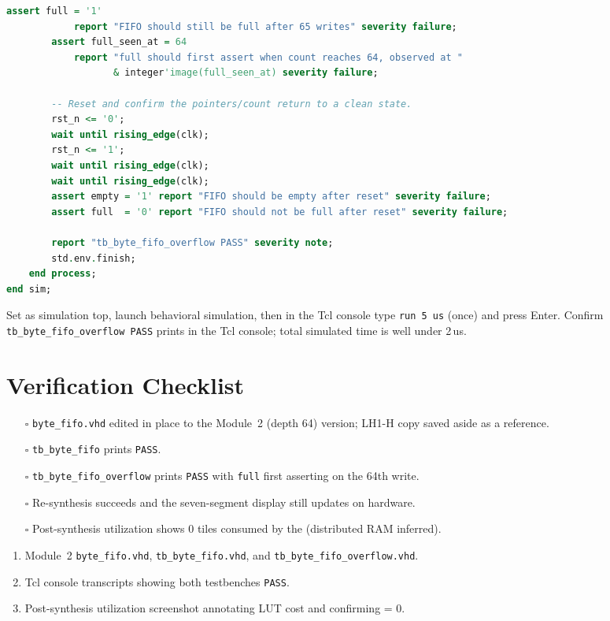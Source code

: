\documentclass[11pt,letterpaper]{article}
\begin{document}
\begin{lstlisting}[language=VHDL, caption={\texttt{tb\_byte\_fifo\_overflow.vhd} --- writes 65 bytes with no reads. Asserts \texttt{full} latches at depth and pointers do not corrupt.}]
        assert full = '1'
            report "FIFO should still be full after 65 writes" severity failure;
        assert full_seen_at = 64
            report "full should first assert when count reaches 64, observed at "
                   & integer'image(full_seen_at) severity failure;

        -- Reset and confirm the pointers/count return to a clean state.
        rst_n <= '0';
        wait until rising_edge(clk);
        rst_n <= '1';
        wait until rising_edge(clk);
        wait until rising_edge(clk);
        assert empty = '1' report "FIFO should be empty after reset" severity failure;
        assert full  = '0' report "FIFO should not be full after reset" severity failure;

        report "tb_byte_fifo_overflow PASS" severity note;
        std.env.finish;
    end process;
end sim;
\end{lstlisting}

Set as simulation top, launch behavioral simulation, then in the Tcl console type \texttt{run 5 us} (once) and press Enter. Confirm \texttt{tb\_byte\_fifo\_overflow PASS} prints in the Tcl console; total simulated time is well under 2\,us.

\section{Verification Checklist}
\begin{itemize}[leftmargin=2em]
	\item[$\square$] \texttt{byte\_fifo.vhd} edited in place to the Module~2 (depth 64) version; LH1-H copy saved aside as a reference.
	\item[$\square$] \texttt{tb\_byte\_fifo} prints \texttt{PASS}.
	\item[$\square$] \texttt{tb\_byte\_fifo\_overflow} prints \texttt{PASS} with \texttt{full} first asserting on the 64th write.
	\item[$\square$] Re-synthesis succeeds and the seven-segment display still updates on hardware.
	\item[$\square$] Post-synthesis utilization shows 0 \BRAM{} tiles consumed by the \FIFO{} (distributed \mbox{RAM} inferred).
\end{itemize}

\begin{tcolorbox}[deliverable={Lab Handout 2-C Deliverable}]
	\begin{enumerate}[leftmargin=1.2em]
		\item Module~2 \texttt{byte\_fifo.vhd}, \texttt{tb\_byte\_fifo.vhd}, and \texttt{tb\_byte\_fifo\_overflow.vhd}.
		\item Tcl console transcripts showing both testbenches \texttt{PASS}.
		\item Post-synthesis utilization screenshot annotating \FIFO{} \mbox{LUT} cost and confirming \BRAM{} = 0.
	\end{enumerate}
\end{tcolorbox}

\printhandoutglossary
\end{document}
